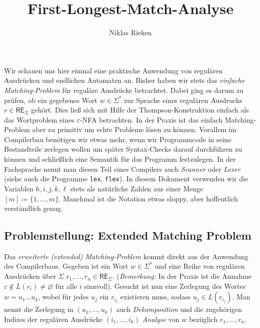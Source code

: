 \documentclass[11pt, a4paper]{article}
\author{Niklas Rieken}
\title{First-Longest-Match-Analyse}
\let\emptyset\varnothing
\theoremstyle{definition}
\theoremstyle{plain}
\begin{document}
\maketitle

Wir schauen uns hier einmal eine praktische Anwendung von regulären Ausdrücken und endlichen Automaten an. Bisher haben wir stets das \textit{einfache Matching-Problem} für reguläre Ausdrücke betrachtet. Dabei ging es darum zu prüfen, ob ein gegebenes Wort \( w \in \Sigma^\ast \) zur Sprache eines regulären Ausdrucks \( r \in \mathsf{RE}_\Sigma \) gehört. Dies ließ sich mit Hilfe der Thompson-Konstruktion einfach als das Wortproblem eines \(\varepsilon\)-NFA betrachten. In der Praxis ist das einfach Matching-Problem aber zu primitiv um echte Probleme lösen zu können. Vorallem im Compilerbau benötigen wir etwas mehr, wenn wir Programmcode in seine Bestandteile zerlegen wollen um später Syntax-Checks darauf durchführen zu können und schließlich eine Semantik für das Programm festzulegen. In der Fachsprache nennt man diesen Teil eines Compilers auch \textit{Scanner} oder \textit{Lexer} (siehe auch die Programme \texttt{lex}, \texttt{flex}).
In diesem Dokument verwenden wir die Variablen \( h, i, j, k, \ell \) stets als natürliche Zahlen aus einer Menge \( [m] \coloneqq \{ 1, \ldots, m \} \). Manchmal ist die Notation etwas sloppy, aber hoffentlich verständlich genug.


\subsection*{Problemstellung: Extended Matching Problem}
Das \textit{erweiterte (extended) Matching-Problem} kommt direkt aus der Anwendung des Compilerbaus. Gegeben ist ein Wort \( w \in \Sigma^\ast \) und eine Reihe von regulären Ausdrücken über $\Sigma$ \( r_1, \ldots, r_n \in \mathsf{RE}_\Sigma \). (\textit{Bemerkung:} In der Praxis ist die Annahme \( \varepsilon \notin L(r_i) \neq \emptyset \) für alle \( i \) sinnvoll). Gesucht ist nun eine Zerlegung des Wortes \( w = u_1 \ldots u_k \), wobei für jedes \( u_j \) ein \( r_{i_j} \) existieren muss, sodass \( u_j \in L(r_{i_j}) \). Man nennt die Zerlegung in \( (u_1, \ldots, u_k) \) auch \textit{Dekomposition} und die zugehörigen Indizes der regulären Ausdrücke \( (i_1, \ldots, i_k) \) \textit{Analyse} von \( w \) bezüglich \( r_1, \ldots, r_n \).
\end{document}
